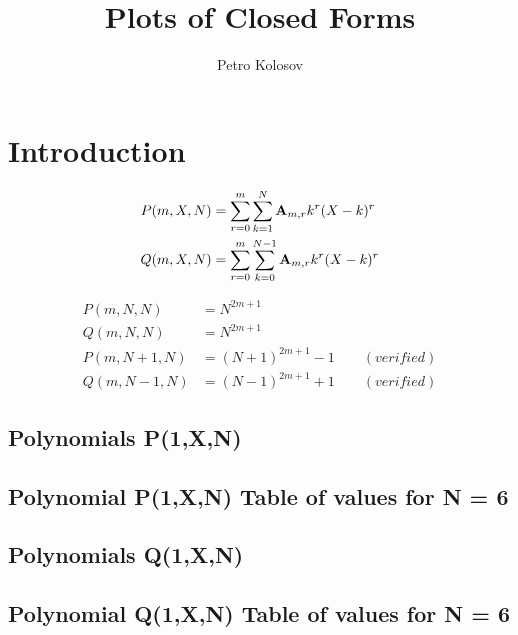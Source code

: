 \documentclass[12pt,letterpaper,oneside,reqno]{amsart}
\title[Plots of Closed Forms]
{Plots of Closed Forms}
\author[Petro Kolosov]{Petro Kolosov}
\newcommand \coeffA [3][A] {{\mathbf{#1}} \sb{#2,#3}}
\newcommand \polynomialP [4][P]{{#1}(#2,#3,#4)}
\newcommand \polynomialQ [4][Q]{{#1}(#2,#3,#4)}
\begin{document}
%        

    \maketitle

    \tableofcontents


    \section{Introduction}\label{sec:introduction}
    \begin{align*}
        \polynomialP{m}{X}{N} &= \sum_{r=0}^{m} \sum_{k=1}^{N} \coeffA{m}{r} k^r (X-k)^r \\
        \polynomialQ{m}{X}{N} &= \sum_{r=0}^{m} \sum_{k=0}^{N-1} \coeffA{m}{r} k^r (X-k)^r
    \end{align*}

    \begin{align*}
        \polynomialP{m}{N}{N} &= N^{2m+1} \\
        \polynomialQ{m}{N}{N} &= N^{2m+1} \\
        \polynomialP{m}{N+1}{N} &= (N+1)^{2m+1} - 1 \quad \quad (verified) \\
        \polynomialQ{m}{N-1}{N} &= (N-1)^{2m+1} + 1 \quad \quad (verified)
    \end{align*}

    \subsection{Polynomials P(1,X,N)}
    

    \subsection{Polynomial P(1,X,N) Table of values for N = 6}
    

    \subsection{Polynomials Q(1,X,N)}
    

    \subsection{Polynomial Q(1,X,N) Table of values for N = 6}
    
\end{document}
